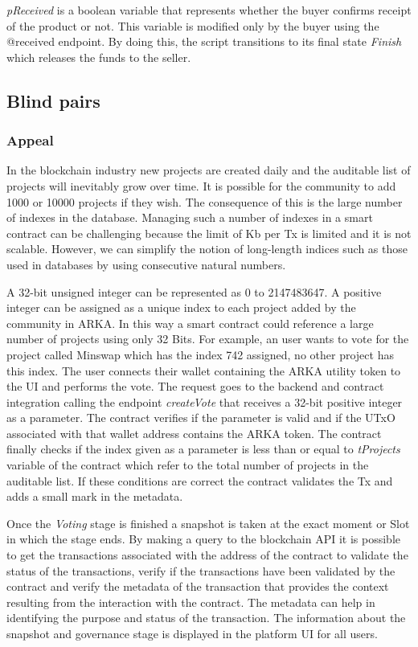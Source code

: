 \documentclass[12pt]{article}
\begin{document}
\emph{pReceived} is a boolean variable that represents whether the buyer confirms receipt of the product or not. This variable is modified only by the buyer using the @received endpoint.
By doing this, the script transitions to its final state \emph{Finish} which releases the funds to the seller.
 
 
\subsection { Blind pairs }  


\subsubsection { Appeal } 


In the blockchain industry new projects are created daily and the auditable list of projects will inevitably grow over time. It is possible for the community to add 1000 or 10000 projects if they wish. The consequence of this is the large number of indexes in the database. Managing such a number of indexes in a smart contract can be challenging because the limit of Kb per Tx is limited and it is not scalable. However, we can simplify the notion of long-length indices such as those used in databases by using consecutive natural numbers.

A 32-bit unsigned integer can be represented as 0 to 2147483647. A positive integer can be assigned as a unique index to each project added by the community in ARKA. In this way a smart contract could reference a large number of projects using only 32 Bits. For example, an user wants to vote for the project called Minswap which has the index 742 assigned, no other project has this index. The user connects their wallet containing the ARKA utility token to the UI and performs the vote. The request goes to the backend and contract integration calling the endpoint \emph{createVote} that receives a 32-bit positive integer as a parameter. The contract verifies if the parameter is valid and if the UTxO associated with that wallet address contains the ARKA token. The contract finally checks if the index given as a parameter is less than or equal to \emph{tProjects} variable of the contract which refer to the total number of projects in the auditable list. If these conditions are correct the contract validates the Tx and adds a small mark in the metadata.


Once the \emph{Voting} stage is finished a snapshot is taken at the exact moment or Slot in which the stage ends. By making a query to the blockchain API it is possible to get the transactions associated with the address of the contract to validate the status of the transactions, verify if the transactions have been validated by the contract and verify the metadata of the transaction that provides the context resulting from the interaction with the contract. The metadata can help in identifying the purpose and status of the transaction. The information about the snapshot and governance stage is displayed in the platform UI for all users.
\end{document}
